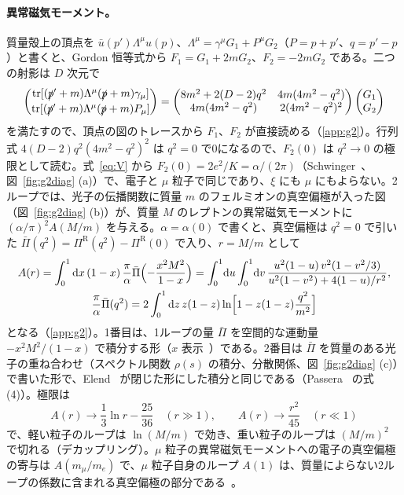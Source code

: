 \documentclass[a4paper,10pt]{ltjsarticle}
\newcommand{\dd}{\mathrm{d}}
\begin{document}
\paragraph{異常磁気モーメント。}質量殻上の頂点を $\bar u(p')\Lambda^\mu u(p)$、$\Lambda^\mu=\gamma^\mu G_1+P^\mu G_2$（$P=p+p'$、$q=p'-p$）と書くと、Gordon 恒等式から $F_1=G_1+2mG_2$、$F_2=-2mG_2$ である。二つの射影は $D$ 次元で
\begin{equation}
\begin{pmatrix}\mathrm{tr}[(\slashed p'+m)\Lambda^\mu(\slashed p+m)\gamma_\mu]\\[2pt] \mathrm{tr}[(\slashed p'+m)\Lambda^\mu(\slashed p+m)P_\mu]\end{pmatrix}
=\begin{pmatrix}8m^2+2(D-2)q^2 & 4m(4m^2-q^2)\\ 4m(4m^2-q^2) & 2(4m^2-q^2)^2\end{pmatrix}
\begin{pmatrix}G_1\\ G_2\end{pmatrix}
\label{eq:proj}
\end{equation}
を満たすので、頂点の図のトレースから $F_1$、$F_2$ が直接読める（\ref{app:g2}）。行列式 $4(D-2)q^2(4m^2-q^2)^2$ は $q^2=0$ で0になるので、$F_2(0)$ は $q^2\to0$ の極限として読む。式~\eqref{eq:V} から $F_2(0)=2e^2/K=\alpha/(2\pi)$（Schwinger~\cite{schwinger48}、図~\ref{fig:g2diag} (a)）で、電子と $\mu$ 粒子で同じであり、$\xi$ にも $\mu$ にもよらない。2ループでは、光子の伝播関数に質量 $m$ のフェルミオンの真空偏極が入った図（図~\ref{fig:g2diag} (b)）が、質量 $M$ のレプトンの異常磁気モーメントに $(\alpha/\pi)^2A(M/m)$ を与える。$\alpha=\alpha(0)$ で書くと、真空偏極は $q^2=0$ で引いた $\bar\Pi(q^2)=\Pi^{\mathrm R}(q^2)-\Pi^{\mathrm R}(0)$ で入り、$r=M/m$ として
\begin{equation}
\begin{gathered}
A(r)=\int_0^1\dd x\,(1-x)\,\frac{\pi}{\alpha}\bar\Pi\Bigl(-\frac{x^2M^2}{1-x}\Bigr)
=\int_0^1\!\dd u\int_0^1\!\dd v\,\frac{u^2(1-u)\,v^2(1-v^2/3)}{u^2(1-v^2)+4(1-u)/r^2},\\
\frac{\pi}{\alpha}\bar\Pi(q^2)=2\int_0^1\dd z\,z(1-z)\ln\Bigl[1-z(1-z)\frac{q^2}{m^2}\Bigr]
\end{gathered}
\label{eq:g2vp}
\end{equation}
となる（\ref{app:g2}）。1番目は、1ループの量 $\bar\Pi$ を空間的な運動量 $-x^2M^2/(1-x)$ で積分する形（$x$ 表示~\cite{lpr72}）である。2番目は $\bar\Pi$ を質量のある光子の重ね合わせ（スペクトル関数 $\rho(s)$ の積分、分散関係、図~\ref{fig:g2diag} (c)）で書いた形で、Elend~\cite{elend66} が閉じた形にした積分と同じである（Passera~\cite{passera05} の式 (4)）。極限は
\begin{equation}
A(r)\to\frac13\ln r-\frac{25}{36}\quad(r\gg1),\qquad A(r)\to\frac{r^2}{45}\quad(r\ll1)
\label{eq:g2asym}
\end{equation}
で、軽い粒子のループは $\ln(M/m)$ で効き、重い粒子のループは $(M/m)^2$ で切れる（デカップリング）。$\mu$ 粒子の異常磁気モーメントへの電子の真空偏極の寄与は $A(m_\mu/m_e)$ で、$\mu$ 粒子自身のループ $A(1)$ は、質量によらない2ループの係数に含まれる真空偏極の部分である~\cite{passera05}。
\end{document}
